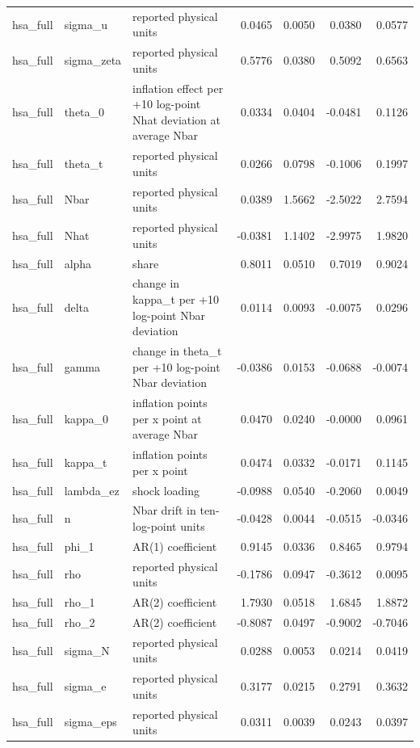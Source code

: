 \begin{tabular}{lllrrrr}
hsa\_full & sigma\_u & reported physical units & 0.0465 & 0.0050 & 0.0380 & 0.0577 \\
hsa\_full & sigma\_zeta & reported physical units & 0.5776 & 0.0380 & 0.5092 & 0.6563 \\
hsa\_full & theta\_0 & inflation effect per +10 log-point Nhat deviation at average Nbar & 0.0334 & 0.0404 & -0.0481 & 0.1126 \\
hsa\_full & theta\_t & reported physical units & 0.0266 & 0.0798 & -0.1006 & 0.1997 \\
hsa\_full & Nbar & reported physical units & 0.0389 & 1.5662 & -2.5022 & 2.7594 \\
hsa\_full & Nhat & reported physical units & -0.0381 & 1.1402 & -2.9975 & 1.9820 \\
hsa\_full & alpha & share & 0.8011 & 0.0510 & 0.7019 & 0.9024 \\
hsa\_full & delta & change in kappa\_t per +10 log-point Nbar deviation & 0.0114 & 0.0093 & -0.0075 & 0.0296 \\
hsa\_full & gamma & change in theta\_t per +10 log-point Nbar deviation & -0.0386 & 0.0153 & -0.0688 & -0.0074 \\
hsa\_full & kappa\_0 & inflation points per x point at average Nbar & 0.0470 & 0.0240 & -0.0000 & 0.0961 \\
hsa\_full & kappa\_t & inflation points per x point & 0.0474 & 0.0332 & -0.0171 & 0.1145 \\
hsa\_full & lambda\_ez & shock loading & -0.0988 & 0.0540 & -0.2060 & 0.0049 \\
hsa\_full & n & Nbar drift in ten-log-point units & -0.0428 & 0.0044 & -0.0515 & -0.0346 \\
hsa\_full & phi\_1 & AR(1) coefficient & 0.9145 & 0.0336 & 0.8465 & 0.9794 \\
hsa\_full & rho & reported physical units & -0.1786 & 0.0947 & -0.3612 & 0.0095 \\
hsa\_full & rho\_1 & AR(2) coefficient & 1.7930 & 0.0518 & 1.6845 & 1.8872 \\
hsa\_full & rho\_2 & AR(2) coefficient & -0.8087 & 0.0497 & -0.9002 & -0.7046 \\
hsa\_full & sigma\_N & reported physical units & 0.0288 & 0.0053 & 0.0214 & 0.0419 \\
hsa\_full & sigma\_e & reported physical units & 0.3177 & 0.0215 & 0.2791 & 0.3632 \\
hsa\_full & sigma\_eps & reported physical units & 0.0311 & 0.0039 & 0.0243 & 0.0397 \\

\end{tabular}
